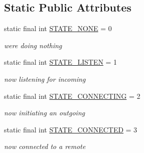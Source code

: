 \subsection*{Static Public Attributes}
\begin{DoxyCompactItemize}
\item 
static final int \mbox{\hyperlink{classhi_1_1world_1_1hello_1_1myapplication_1_1_bluetooth_service_a84307529177c1fe5ad70e8967dd759eb}{S\+T\+A\+T\+E\+\_\+\+N\+O\+NE}} = 0
\begin{DoxyCompactList}\small\item\em we\textquotesingle{}re doing nothing \end{DoxyCompactList}\item 
static final int \mbox{\hyperlink{classhi_1_1world_1_1hello_1_1myapplication_1_1_bluetooth_service_aa1fb3aedceb6c7ca7dfcfff5258e82e2}{S\+T\+A\+T\+E\+\_\+\+L\+I\+S\+T\+EN}} = 1
\begin{DoxyCompactList}\small\item\em now listening for incoming \end{DoxyCompactList}\item 
static final int \mbox{\hyperlink{classhi_1_1world_1_1hello_1_1myapplication_1_1_bluetooth_service_a3a532ca17415e49fcd2649bb6a9d6ee9}{S\+T\+A\+T\+E\+\_\+\+C\+O\+N\+N\+E\+C\+T\+I\+NG}} = 2
\begin{DoxyCompactList}\small\item\em now initiating an outgoing \end{DoxyCompactList}\item 
static final int \mbox{\hyperlink{classhi_1_1world_1_1hello_1_1myapplication_1_1_bluetooth_service_a45e0a4fc5ed009b398c94bd582e35fdc}{S\+T\+A\+T\+E\+\_\+\+C\+O\+N\+N\+E\+C\+T\+ED}} = 3
\begin{DoxyCompactList}\small\item\em now connected to a remote \end{DoxyCompactList}\end{DoxyCompactItemize}
